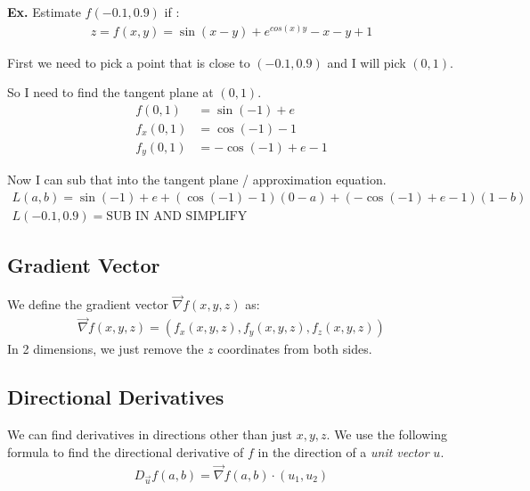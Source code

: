 \documentclass[12pt,letterpaper]{article} \usepackage{amsmath} \usepackage{graphicx}  \usepackage{longtable}  \usepackage{amssymb}
\begin{document}
        \begin{mdframed}
            \textbf{Ex. } Estimate $f(-0.1,0.9)$ if :
            \begin{align*}
                z=f(x,y)=\sin(x-y)+e^{cos(x)y}-x-y+1
            \end{align*}

            First we need to pick a point that is close to $(-0.1, 0.9)$ and I will pick $(0,1)$. 

            So I need to find the tangent plane at $(0, 1)$.
            \begin{align*}
                f(0,1) &= \sin(-1)+e\\
                f_x(0,1) &=\cos(-1)-1\\
                f_y(0,1)&=-\cos(-1)+e-1
            \end{align*}

            Now I can sub that into the tangent plane / approximation equation.
            \begin{align*}
                L(a,b) = \sin(-1)+e + (\cos(-1)-1)(0-a)+(-\cos(-1)+e-1)(1-b)\\
                L(-0.1, 0.9) = \text{SUB IN AND SIMPLIFY}
            \end{align*}
        \end{mdframed}

        \subsection{Gradient Vector}
        We define the gradient vector $\vec{\nabla}f(x,y,z)$ as:
        \begin{align*}
            \vec{\nabla}f(x,y,z) = (f_x (x,y,z), f_y (x,y,z), f_z (x,y,z))
        \end{align*}
        In 2 dimensions, we just remove the $z$ coordinates from both sides. 

        \subsection{Directional Derivatives}
        We can find derivatives in directions other than just $x, y, z$. We use the following formula to find the directional derivative of $f$ in the direction of a \emph{unit vector }$u$.
        \begin{align*}
            D_{\vec{u}} f(a,b) = \vec{\nabla}f(a,b)\cdot (u_1, u_2)
        \end{align*}
\end{document}
